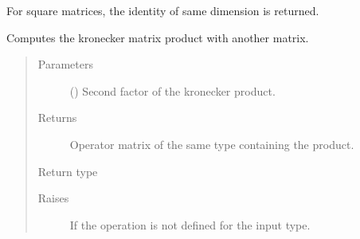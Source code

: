 \documentclass[letterpaper,10pt,english]{sphinxmanual}
\begin{document}
\begin{fulllineitems}

\begin{fulllineitems}
\label{\detokenize{qsim:qsim.matrix.OperatorMatrix.identity_like}}
For square matrices, the identity of same dimension is returned.

\end{fulllineitems}


\begin{fulllineitems}
\label{\detokenize{qsim:qsim.matrix.OperatorMatrix.kron}}
Computes the kronecker matrix product with another matrix.
\begin{quote}\begin{description}
\item[{Parameters}] \leavevmode
{} ({\hyperref[\detokenize{qsim:qsim.matrix.OperatorMatrix}]{}}) \textendash{} Second factor of the kronecker product.

\item[{Returns}] \leavevmode
{} \textendash{} Operator matrix of the same type containing the product.

\item[{Return type}] \leavevmode
{\hyperref[\detokenize{qsim:qsim.matrix.OperatorMatrix}]{}}

\item[{Raises}] \leavevmode
{} \textendash{} If the operation is not defined for the input type.

\end{description}\end{quote}

\end{fulllineitems}


\end{fulllineitems}
\end{document}
